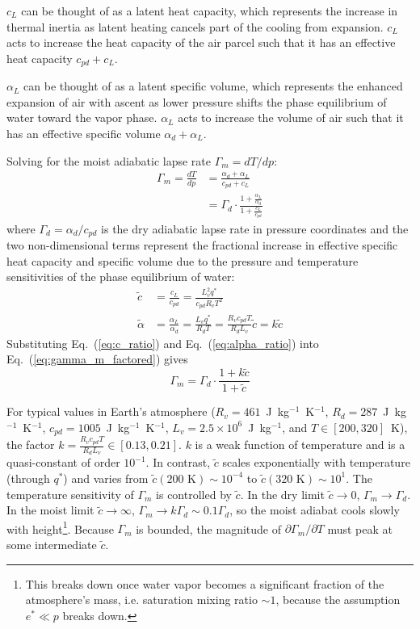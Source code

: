 \documentclass[draft,twocol]{ametsocV6.1}
\begin{document}
$c_L$ can be thought of as a latent heat capacity, which represents the increase in thermal inertia as latent heating cancels part of the cooling from expansion. $c_L$ acts to increase the heat capacity of the air parcel such that it has an effective heat capacity $c_{pd} + c_L$.

$\alpha_L$ can be thought of as a latent specific volume, which represents the enhanced expansion of air with ascent as lower pressure shifts the phase equilibrium of water toward the vapor phase. $\alpha_L$ acts to increase the volume of air such that it has an effective specific volume $\alpha_d + \alpha_L$.

Solving for the moist adiabatic lapse rate $\Gamma_m = dT/dp$:
\begin{align}
\Gamma_m = \frac{dT}{dp} &= \frac{\alpha_d +\alpha_L}{c_{pd} + c_L} \label{eq:gamma_m_ratio} \\
&= \Gamma_d \cdot \frac{1+\frac{\alpha_L}{\alpha_d}}{1+\frac{c_L}{c_{pd}}} \label{eq:gamma_m_factored}
\end{align}
where $\Gamma_d = \alpha_d / c_{pd}$ is the dry adiabatic lapse rate in pressure coordinates and the two non-dimensional terms represent the fractional increase in effective specific heat capacity and specific volume due to the pressure and temperature sensitivities of the phase equilibrium of water:
\begin{align}
\tilde{c} &= \frac{c_L}{c_{pd}} = \frac{L_v^2 q^*}{c_{pd} R_v T^2} \label{eq:c_ratio} \\
\tilde{\alpha} &= \frac{\alpha_L}{\alpha_d} = \frac{L_v q^*}{R_d T} = \frac{R_v c_{pd}T}{R_dL_v}\tilde{c} = k\tilde{c} \label{eq:alpha_ratio}
\end{align}
Substituting Eq.~(\ref{eq:c_ratio}) and Eq.~(\ref{eq:alpha_ratio}) into Eq.~(\ref{eq:gamma_m_factored}) gives
\begin{equation}
\Gamma_m = \Gamma_d \cdot \frac{1 + k\tilde{c}}{1 + \tilde{c}} \label{eq:gamma_m_tilde}
\end{equation}

For typical values in Earth's atmosphere ($R_v=461$~J~kg$^{-1}$~K$^{-1}$, $R_d=287$~J~kg$^{-1}$~K$^{-1}$, $c_{pd}=1005$~J~kg$^{-1}$~K$^{-1}$, $L_v=2.5\times10^6$~J~kg$^{-1}$, and $T \in [200, 320]$~K), the factor $k=\frac{R_v c_{pd}T}{R_dL_v}\in [0.13, 0.21]$. $k$ is a weak function of temperature and is a quasi-constant of order $10^{-1}$. In contrast, $\tilde{c}$ scales exponentially with temperature (through $q^*$) and varies from $\tilde{c}(200\text{~K})\sim 10^{-4}$ to $\tilde{c}(320\text{~K})\sim 10^{1}$. The temperature sensitivity of $\Gamma_m$ is controlled by $\tilde{c}$. In the dry limit $\tilde{c}\to0$, $\Gamma_m\to\Gamma_d$. In the moist limit $\tilde{c} \to \infty$, $\Gamma_m\to k\Gamma_d\sim 0.1\Gamma_d$, so the moist adiabat cools slowly with height\footnote{This breaks down once water vapor becomes a significant fraction of the atmosphere's mass, i.e. saturation mixing ratio $\sim1$, because the assumption $e^*\ll p$ breaks down.}. Because $\Gamma_m$ is bounded, the magnitude of $\partial\Gamma_m/\partial T$ must peak at some intermediate $\tilde{c}$.
\end{document}
